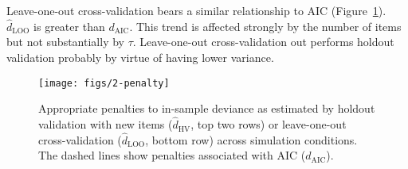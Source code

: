 Leave-one-out cross-validation bears a similar relationship to AIC (Figure~\ref{fig:2-penalty}). $\hat d_{\mathrm{LOO}}$ is greater than $d_\mathrm{AIC}$. This trend is affected strongly by the number of items but not substantially by $\tau$. Leave-one-out cross-validation out performs holdout validation probably by virtue of having lower variance.

\begin{figure}
	\centering
	\texttt{[image: figs/2-penalty]}
	\caption{Appropriate penalties to in-sample deviance as estimated by holdout validation with new items ($\hat d_{\mathrm{HV}}$, top two rows) or leave-one-out cross-validation ($\hat d_{\mathrm{LOO}}$, bottom row) across simulation conditions. The dashed lines show penalties associated with AIC ($d_\mathrm{AIC}$).}
	\label{fig:2-penalty}
\end{figure}


%
%







